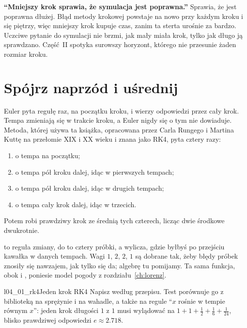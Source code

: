 \begin{trapbox}
\textbf{\enquote{Mniejszy krok sprawia, że symulacja jest poprawna.}} Sprawia,
że jest poprawna dłużej. Błąd metody krokowej powstaje na nowo przy każdym
kroku i się piętrzy, więc mniejszy krok kupuje czas, zanim ta sterta urośnie
za bardzo. Uczciwe pytanie do symulacji nie brzmi, jak mały miała krok, tylko
jak długo ją sprawdzano. Część~II spotyka surowszy horyzont, którego nie
przesunie żaden rozmiar kroku.
\end{trapbox}

\section{Spójrz naprzód i uśrednij}
\label{sec:ch04-rk4}

\noindent
Euler pyta regułę raz, na początku kroku, i wierzy odpowiedzi przez cały
krok. Tempa zmieniają się w trakcie kroku, a Euler nigdy się o tym nie
dowiaduje. Metoda, której używa ta książka, opracowana przez Carla Rungego i
Martina Kuttę na przełomie XIX i XX wieku i znana jako RK4, pyta cztery razy:
\begin{enumerate}
\item o tempa na początku;
\item o tempa pół kroku dalej, idąc w pierwszych tempach;
\item o tempa pół kroku dalej, idąc w drugich tempach;
\item o tempa cały krok dalej, idąc w trzecich.
\end{enumerate}
Potem robi prawdziwy krok ze średnią tych czterech, licząc dwie środkowe
dwukrotnie.


\noindent
{} to reguła zmiany,  do  to cztery próbki, a
 wylicza, gdzie byłbyś po przejściu kawałka w danych tempach.
Wagi $1$, $2$, $2$, $1$ są dobrane tak, żeby błędy próbek znosiły się
nawzajem, jak tylko się da; algebrę tu pomijamy. Ta sama funkcja, obok
 i , poniesie model pogody z
rozdziału~\ref{ch:lorenz}.

\begin{lab}{l04_01_rk4}{Jeden krok RK4}
Napisz  według przepisu. Test porównuje go z biblioteką na
sprężynie i na wahadle, a także na regule \enquote{$x$ rośnie w tempie
równym $x$}: jeden krok długości $1$ z $1$ musi wylądować na $1 + 1 +
\tfrac{1}{2} + \tfrac{1}{6} + \tfrac{1}{24}$, blisko prawdziwej odpowiedzi
$e \approx \num{2.718}$.
\end{lab}

